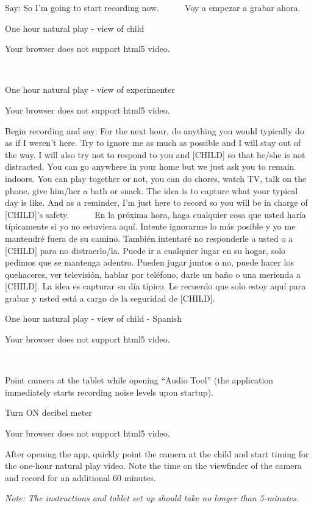 \documentclass[
  12pt,
]{book}
\begin{document}
Say: So I'm going to start recording now.
    Voy a empezar a grabar ahora.

One hour natural play - view of child

Your browser does not support html5 video.

 

One hour natural play - view of experimenter

Your browser does not support html5 video.

Begin recording and say: For the next hour, do anything you would typically do as if I weren't here. Try to ignore me as much as possible and I will stay out of the way. I will also try not to respond to you and {[}CHILD{]} so that he/she is not distracted. You can go anywhere in your home but we just ask you to remain indoors. You can play together or not, you can do chores, watch TV, talk on the phone, give him/her a bath or snack. The idea is to capture what your typical day is like. And as a reminder, I'm just here to record so you will be in charge of {[}CHILD{]}'s safety.
    En la próxima hora, haga cualquier cosa que usted haría típicamente si yo no estuviera aquí. Intente ignorarme lo más posible y yo me mantendré fuera de su camino. También intentaré no responderle a usted o a {[}CHILD{]} para no distraerlo/la. Puede ir a cualquier lugar en su hogar, solo pedimos que se mantenga adentro. Pueden jugar juntos o no, puede hacer los quehaceres, ver televisión, hablar por teléfono, darle un baño o una merienda a {[}CHILD{]}. La idea es capturar su día típico. Le recuerdo que solo estoy aquí para grabar y usted está a cargo de la seguridad de {[}CHILD{]}.

One hour natural play - view of child - Spanish

Your browser does not support html5 video.

 

Point camera at the tablet while opening ``Audio Tool'' (the application immediately starts recording noise levels upon startup).

Turn ON decibel meter

Your browser does not support html5 video.

After opening the app, quickly point the camera at the child and start timing for the one-hour natural play video. Note the time on the viewfinder of the camera and record for an additional 60 minutes.

\emph{Note: The instructions and tablet set up should take no longer than 5-minutes.}
\end{document}
